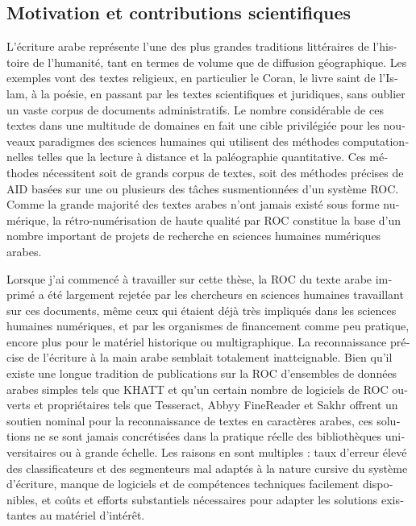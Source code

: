 \begin{french}
\section{Motivation et contributions scientifiques}

L'écriture arabe représente l'une des plus grandes traditions littéraires de
l'histoire de l'humanité, tant en termes de volume que de diffusion
géographique. Les exemples vont des textes religieux, en particulier le Coran,
le livre saint de l'Islam, à la poésie, en passant par les textes scientifiques
et juridiques, sans oublier un vaste corpus de documents administratifs. Le
nombre considérable de ces textes dans une multitude de domaines en fait une
cible privilégiée pour les nouveaux paradigmes des sciences humaines qui
utilisent des méthodes computationnelles telles que la lecture à distance et la
paléographie quantitative. Ces méthodes nécessitent soit de grands corpus de
textes, soit des méthodes précises de AID basées sur une ou plusieurs des
tâches susmentionnées d'un système ROC. Comme la grande majorité des textes
arabes n'ont jamais existé sous forme numérique, la rétro-numérisation de haute
qualité par ROC constitue la base d'un nombre important de projets de recherche
en sciences humaines numériques arabes.

Lorsque j'ai commencé à travailler sur cette thèse, la ROC du texte arabe
imprimé a été largement rejetée par les chercheurs en sciences humaines
travaillant sur ces documents, même ceux qui étaient déjà très impliqués dans
les sciences humaines numériques, et par les organismes de financement comme
peu pratique, encore plus pour le matériel historique ou multigraphique. La
reconnaissance précise de l'écriture à la main arabe semblait totalement
inatteignable. Bien qu'il existe une longue tradition de publications sur la
ROC d'ensembles de données arabes simples tels que KHATT\cite{mahmoud2014khatt}
et qu'un certain nombre de logiciels de ROC ouverts et propriétaires tels que
Tesseract, Abbyy FineReader et Sakhr offrent un soutien nominal pour la
reconnaissance de textes en caractères arabes, ces solutions ne se sont jamais
concrétisées dans la pratique réelle des bibliothèques universitaires ou à
grande échelle. Les raisons en sont multiples : taux d'erreur élevé des
classificateurs et des segmenteurs mal adaptés à la nature cursive du système
d'écriture, manque de logiciels et de compétences techniques facilement
disponibles, et coûts et efforts substantiels nécessaires pour adapter les
solutions existantes au matériel d'intérêt.


\end{french}
